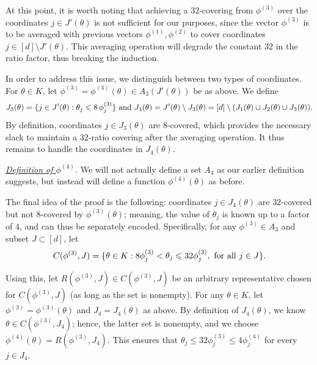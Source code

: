 \documentclass[11pt]{article}
\renewcommand{\leq}{\leqslant}
\theoremstyle{definition}
\theoremstyle{remark}
\DeclarePairedDelimiter{\set}{\{}{\}}
\begin{document}
  At this point, it is worth noting that achieving a $32$-covering from $\phi^{(3)}$ over the coordinates $j \in J'(\theta)$ is not sufficient for our purposes, since the vector $\phi^{(3)}$ is to be averaged with previous vectors $\phi^{(1)}, \phi^{(2)}$ to cover coordinates $j \in [d] \setminus J'(\theta)$.
  This averaging operation will degrade the constant $32$ in the ratio factor, thus breaking the induction.


  In order to address this issue, we distinguish between two types of coordinates.
  For $\theta \in K$, let $\phi^{(3)} = \phi^{(3)} (\theta) \in A_3 (J'(\theta))$ be as above.
  We define 
  \[J_3 (\theta) = \set{j \in J'(\theta) : \theta_j \leq 8 \,\phi_{j}^{(3)}}\textrm{ and }J_4 (\theta) = J'(\theta) \setminus J_3 (\theta) = [d] \setminus (J_1 (\theta) \cup J_2 (\theta) \cup J_3 (\theta)).\]
  By definition, coordinates $j \in J_3 (\theta)$ are $8$-covered, which provides the necessary slack to maintain a $32$-ratio covering after the averaging operation.
  It thus remains to handle the coordinates in $J_4 (\theta)$.

  \emph{\underline{Definition of $\phi^{(4)}$}.} We will not actually define a set $A_4$ as our earlier definition suggests, but instead will define a function $\phi^{(4)}(\theta)$ as before.
  
  The final idea of the proof is the following: coordinates $j \in J_4 (\theta)$ are $32$-covered but not $8$-covered by $\phi^{(3)} (\theta)$; meaning, the value of $\theta_j$ is known up to a factor of $4$, and can thus be separately encoded. Specifically, for any $\phi^{(3)} \in A_3$ and subset $J \subset [d]$, let
  \[C (\phi^{(3)}, J) = \set{\theta \in K : 8 \phi_{j}^{(3)} < \theta_j \leq 32 \phi_{j}^{(3)},\ \textrm{for all}\ j \in J}.\]
  
  Using this, let $R(\phi^{(3)}, J) \in C (\phi^{(3)}, J)$ be an arbitrary representative chosen for $C (\phi^{(3)}, J)$ (as long as the set is nonempty).   For any $\theta \in K$, let $\phi^{(3)} = \phi^{(3)} (\theta)$ and $J_4 = J_4 (\theta)$ as above. 
  By definition of $J_4 (\theta)$, we know $\theta \in C (\phi^{(3)}, J_4)$; hence, the latter set is nonempty, and we choose $\phi^{(4)}(\theta) = R (\phi^{(3)}, J_4)$.
  This ensures that $\theta_j \leq 32 \phi_{j}^{(3)} \leq 4 \phi_{j}^{(4)}$ for every $j \in J_4$.
\end{document}

